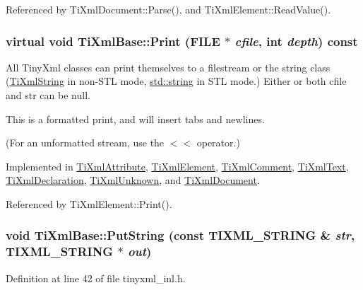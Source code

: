 Referenced by TiXmlDocument::Parse(), and TiXmlElement::ReadValue().\hypertarget{class_ti_xml_base_a0de56b3f2ef14c65091a3b916437b512}{
\subsubsection[{Print}]{\setlength{\rightskip}{0pt plus 5cm}virtual void TiXmlBase::Print (FILE $\ast$ {\em cfile}, \/  int {\em depth}) const}}
\label{class_ti_xml_base_a0de56b3f2ef14c65091a3b916437b512}
All TinyXml classes can print themselves to a filestream or the string class (\hyperlink{class_ti_xml_string}{TiXmlString} in non-\/STL mode, \hyperlink{classstd_1_1string}{std::string} in STL mode.) Either or both cfile and str can be null.

This is a formatted print, and will insert tabs and newlines.

(For an unformatted stream, use the $<$$<$ operator.) 

Implemented in \hyperlink{class_ti_xml_attribute_acc04956c1d5c4c31fe74f7a7528d109a}{TiXmlAttribute}, \hyperlink{class_ti_xml_element_ad9d0c008866982ab8d9aafae7e14d692}{TiXmlElement}, \hyperlink{class_ti_xml_comment_a17398061d62c470f57801ce28fa33ad4}{TiXmlComment}, \hyperlink{class_ti_xml_text_ae74d56c5b3ddec6cc3103dd51821af92}{TiXmlText}, \hyperlink{class_ti_xml_declaration_abf6303db4bd05b5be554036817ff1cb4}{TiXmlDeclaration}, \hyperlink{class_ti_xml_unknown_a025f19c21ef01ea9be50febb8fe0ba06}{TiXmlUnknown}, and \hyperlink{class_ti_xml_document_a7b1aea204fee266b70b9c105c8bf2ada}{TiXmlDocument}.

Referenced by TiXmlElement::Print().\hypertarget{class_ti_xml_base_a283ddc4f1f53a53e7111eff4e12a63d9}{
\subsubsection[{PutString}]{\setlength{\rightskip}{0pt plus 5cm}void TiXmlBase::PutString (const TIXML\_\-STRING \& {\em str}, \/  TIXML\_\-STRING $\ast$ {\em out})}}
\label{class_ti_xml_base_a283ddc4f1f53a53e7111eff4e12a63d9}


Definition at line 42 of file tinyxml\_\-inl.h.

